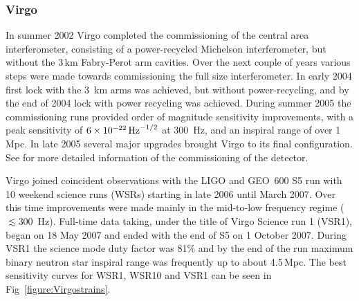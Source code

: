 \documentclass{article}
\begin{document}
\subsubsection{Virgo}
In summer 2002 Virgo completed the commissioning of the central area
interferometer, consisting of a power-recycled Michelson interferometer, but
without the 3\,km Fabry-Perot arm cavities. Over the next couple of years
various steps were made towards commissioning the full size interferometer. In
early 2004 first lock with the 3~km arms was achieved, but without
power-recycling, and by the end of 2004 lock with power recycling was achieved.
During summer 2005 the commissioning runs provided order of magnitude
sensitivity improvements, with a peak sensitivity of $6\times10^{-22}\,{\rm
Hz}^{-1/2}$ at 300~Hz, and an inspiral range of over 1\,Mpc. In late 2005
several major upgrades brought Virgo to its final configuration. See
\cite{Acernese:2004, Acernese:2005, Acernese:2006, Acernese:2007} for more
detailed information of the commissioning of the detector.

Virgo joined coincident observations with the LIGO and GEO~600 S5 run with
10 weekend science runs (WSRs) starting in late 2006 until March 2007. Over this
time improvements were made mainly in the mid-to-low frequency regime ($\lesssim
300$~Hz). Full-time data taking, under the title of Virgo Science run 1 (VSR1),
began on 18 May 2007 and ended with the end of S5 on 1 October 2007. During VSR1
the science mode duty factor was 81\% and by the end of the run maximum binary
neutron star inspiral range was frequently up to about 4.5\,Mpc. The best
sensitivity curves for WSR1, WSR10 and VSR1 can be seen in
Fig~\ref{figure:Virgostrains}.

\end{document}
